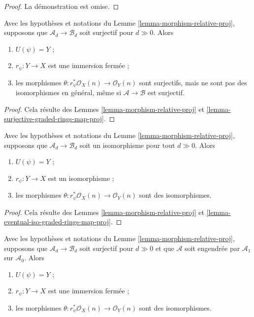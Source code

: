 \begin{proof}
La démonstration est omise.
\end{proof}

\begin{lemma}
\label{lemma-surjective-graded-rings-map-relative-proj}
Avec les hypothèses et notations du Lemme \ref{lemma-morphism-relative-proj},
supposons que $\mathcal{A}_d \to \mathcal{B}_d$ soit surjectif pour
$d \gg 0$. Alors
\begin{enumerate}
\item $U(\psi) = Y$ ;
\item $r_\psi : Y \to X$ est une immersion fermée ;
\item les morphismes $\theta : r_\psi^*\mathcal{O}_X(n) \to \mathcal{O}_Y(n)$
sont surjectifs, mais ne sont pas des isomorphismes en général, même si
$\mathcal{A} \to \mathcal{B}$ est surjectif.
\end{enumerate}
\end{lemma}

\begin{proof}
Cela résulte des Lemmes
\ref{lemma-morphism-relative-proj}
et
\ref{lemma-surjective-graded-rings-map-proj}.
\end{proof}

\begin{lemma}
\label{lemma-eventual-iso-graded-rings-map-relative-proj}
Avec les hypothèses et notations du Lemme \ref{lemma-morphism-relative-proj},
supposons que $\mathcal{A}_d \to \mathcal{B}_d$ soit un isomorphisme pour
tout $d \gg 0$. Alors
\begin{enumerate}
\item $U(\psi) = Y$ ;
\item $r_\psi : Y \to X$ est un isomorphisme ;
\item les morphismes $\theta : r_\psi^*\mathcal{O}_X(n) \to \mathcal{O}_Y(n)$
sont des isomorphismes.
\end{enumerate}
\end{lemma}

\begin{proof}
Cela résulte des Lemmes
\ref{lemma-morphism-relative-proj}
et
\ref{lemma-eventual-iso-graded-rings-map-proj}.
\end{proof}

\begin{lemma}
\label{lemma-surjective-generated-degree-1-map-relative-proj}
Avec les hypothèses et notations du Lemme \ref{lemma-morphism-relative-proj},
supposons que $\mathcal{A}_d \to \mathcal{B}_d$ soit surjectif pour
$d \gg 0$ et que $\mathcal{A}$ soit engendrée par $\mathcal{A}_1$ sur
$\mathcal{A}_0$. Alors
\begin{enumerate}
\item $U(\psi) = Y$ ;
\item $r_\psi : Y \to X$ est une immersion fermée ;
\item les morphismes $\theta : r_\psi^*\mathcal{O}_X(n) \to \mathcal{O}_Y(n)$
sont des isomorphismes.
\end{enumerate}
\end{lemma}

